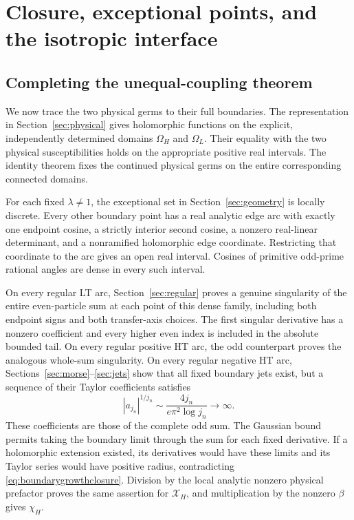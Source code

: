 \documentclass[11pt]{article}
\numberwithin{equation}{section}
\theoremstyle{definition}
\newcommand{\OH}{\Omega_H}
\newcommand{\OL}{\Omega_L}
\newcommand{\XH}{\mathcal X_H}
\begin{document}


\section{Closure, exceptional points, and the isotropic interface}\label{sec:closure}

\subsection{Completing the unequal-coupling theorem}
We now trace the two physical germs to their full boundaries. The
representation in Section~\ref{sec:physical} gives holomorphic functions
on the explicit, independently determined domains $\OH$ and $\OL$.
Their equality with the two physical susceptibilities holds on the
appropriate positive real intervals. The identity theorem fixes the
continued physical germs on the entire corresponding connected domains.

For each fixed $\lambda\ne1$, the exceptional set in
Section~\ref{sec:geometry} is locally discrete. Every other boundary
point has a real analytic edge arc with exactly one endpoint cosine,
a strictly interior second cosine, a nonzero real-linear determinant,
and a nonramified holomorphic edge coordinate. Restricting that
coordinate to the arc gives an open real interval. Cosines of primitive
odd-prime rational angles are dense in every such interval.

On every regular LT arc, Section~\ref{sec:regular} proves a genuine
singularity of the entire even-particle sum at each point of this dense
family, including both endpoint signs and both transfer-axis choices.
The first singular derivative has a nonzero coefficient and every
higher even index is included in the absolute bounded tail. On every
regular positive HT arc, the odd counterpart proves the analogous
whole-sum singularity. On every regular negative HT arc,
Sections~\ref{sec:morse}--\ref{sec:jets} show that all fixed boundary
jets exist, but a sequence of their Taylor coefficients satisfies
\begin{equation}\label{eq:boundarygrowthclosure}
 |a_{j_n}|^{1/j_n}\sim\frac{4j_n}{e\pi^2\log j_n}\longrightarrow\infty.
\end{equation}
These coefficients are those of the complete odd sum. The Gaussian
bound permits taking the boundary limit through the sum for each fixed
derivative. If a holomorphic extension existed, its derivatives would
have these limits and its Taylor series would have positive radius,
contradicting \eqref{eq:boundarygrowthclosure}. Division by the local
analytic nonzero physical prefactor proves the same assertion for
$\XH$, and multiplication by the nonzero $\beta$ gives $\chi_H$.
\end{document}
